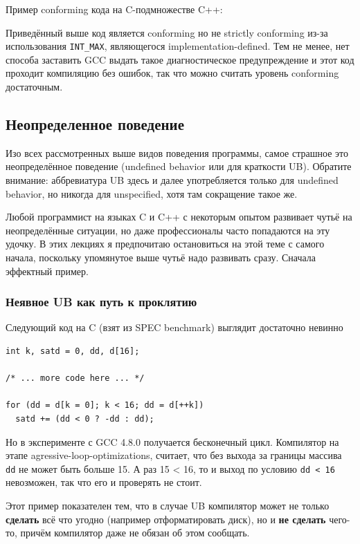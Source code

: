 \documentclass[a4paper,12pt,oneside]{article}
\begin{document}
Пример conforming кода на C-подмножестве C++:



Приведённый выше код является conforming но не strictly conforming из-за использования \lstinline!INT_MAX!, являющегося implementation-defined. Тем не менее, нет способа заставить GCC выдать такое диагностическое предупреждение и этот код проходит компиляцию без ошибок, так что можно считать уровень conforming достаточным.

\pagebreak
\subsection{Неопределенное поведение}\label{UB}

Изо всех рассмотренных выше видов поведения программы, самое страшное это неопределённое поведение (undefined behavior или для краткости UB). Обратите внимание: аббревиатура UB здесь и далее употребляется только для undefined behavior, но никогда для unspecified, хотя там сокращение такое же.

Любой программист на языках C и C++ с некоторым опытом развивает чутьё на неопределённые ситуации, но даже профессионалы часто попадаются на эту удочку. В этих лекциях я предпочитаю остановиться на этой теме с самого начала, поскольку упомянутое выше чутьё надо развивать сразу. Сначала эффектный пример.

\subsubsection{Неявное UB как путь к проклятию}\label{HiddenUB}

Следующий код на C (взят из SPEC benchmark) выглядит достаточно невинно

\begin{lstlisting}
int k, satd = 0, dd, d[16];

/* ... more code here ... */

for (dd = d[k = 0]; k < 16; dd = d[++k])
  satd += (dd < 0 ? -dd : dd);
\end{lstlisting}

Но в эксперименте с GCC 4.8.0 получается бесконечный цикл. Компилятор на этапе agressive-loop-optimizations, считает, что без выхода за границы массива \lstinline!dd! не может быть больше 15. А раз 15 < 16, то и выход по условию \lstinline!dd < 16! невозможен, так что его и проверять не стоит.

Этот пример показателен тем, что в случае UB компилятор может не только \textbf{сделать} всё что угодно (например отформатировать диск), но и \textbf{не сделать} чего-то, причём компилятор даже не обязан об этом сообщать.
\end{document}
